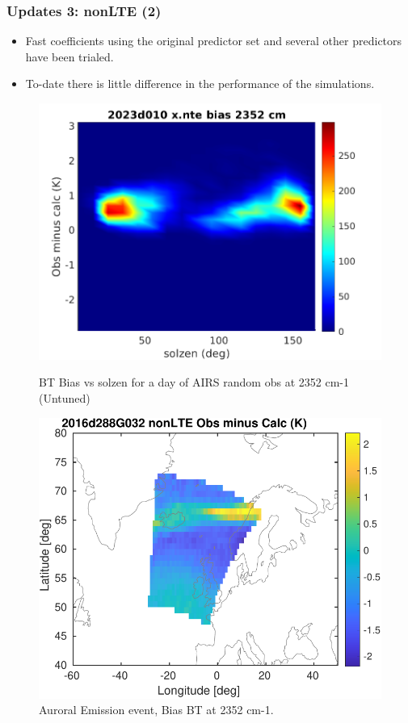 \documentclass[10pt,t]{beamer}
\begin{document}
\begin{frame}
  \frametitle{Updates 3: nonLTE (2)}
  \begin{itemize}
  \item Fast coefficients using the original predictor set and several other predictors have been
    trialed.
  \item To-date there is little difference in the performance of the simulations.
\end{itemize}
  
\begin{figure}
\begin{minipage}[c]{0.45\linewidth}
  \includegraphics[width=\linewidth]{./Figs/2023d010_airs_xnte_bias_vs_solz_pcolor2.png}
  \caption{BT Bias vs solzen for a day of AIRS random obs at 2352 cm-1 (Untuned)}
\end{minipage}
\hfill
\begin{minipage}[c]{0.45\linewidth}
  \includegraphics[width=\linewidth]{./Figs/2016d288g032_nlte_bias_obs_calc_map.pdf}
  \caption{Auroral Emission event, Bias BT at 2352 cm-1.}
\end{minipage}
\end{figure}


\end{frame}      
\end{document}
